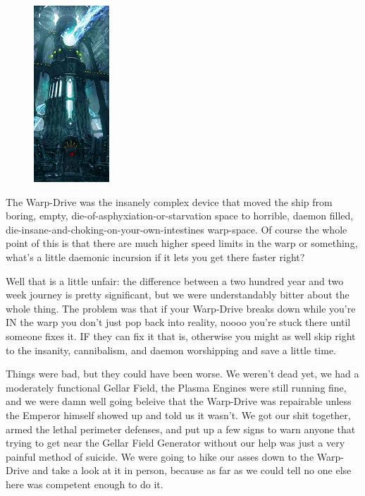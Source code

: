 \begin{figure}
	\begin{center}
		\includegraphics[width=\figwidth]{pics/7/20.png}
	\end{center}
\end{figure}
The Warp-Drive was the insanely complex device that moved the ship from boring, empty, die-of-asphyxiation-or-starvation space to horrible, daemon filled, die-insane-and-choking-on-your-own-intestines warp-space. 
Of course the whole point of this is that there are much higher speed limits in the warp or something, what’s a little daemonic incursion if it lets you get there faster right? 


Well that is a little unfair: 
the difference between a two hundred year and two week journey is pretty significant, but we were understandably bitter about the whole thing. 
The problem was that if your Warp-Drive breaks down while you’re IN the warp you don’t just pop back into reality, noooo you’re stuck there until someone fixes it. 
IF they can fix it that is, otherwise you might as well skip right to the insanity, cannibalism, and daemon worshipping and save a little time.

Things were bad, but they could have been worse. 
We weren’t dead yet, we had a moderately functional Gellar Field, the Plasma Engines were still running fine, and we were damn well going beleive that the Warp-Drive was repairable unless the Emperor himself showed up and told us it wasn’t. 
We got our shit together, armed the lethal perimeter defenses, and put up a few signs to warn anyone that trying to get near the Gellar Field Generator without our help was just a very painful method of suicide. 
We were going to hike our asses down to the Warp-Drive and take a look at it in person, because as far as we could tell no one else here was competent enough to do it. 


